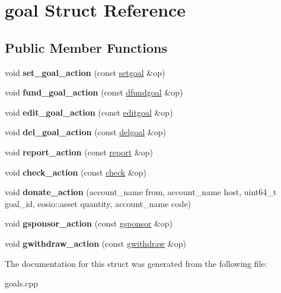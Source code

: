 \hypertarget{structgoal}{}\section{goal Struct Reference}
\label{structgoal}
\subsection*{Public Member Functions}
\begin{DoxyCompactItemize}
\item 
\mbox{\label{structgoal_a2b4d6d4cae626c821e7f9db68bed234c}} 
void {\bfseries set\+\_\+goal\+\_\+action} (const \mbox{\hyperlink{structeosio_1_1setgoal}{setgoal}} \&op)
\item 
\mbox{\label{structgoal_a6b94d23a3260c39ea4a8e4d7dec1eb48}} 
void {\bfseries fund\+\_\+goal\+\_\+action} (const \mbox{\hyperlink{structeosio_1_1dfundgoal}{dfundgoal}} \&op)
\item 
\mbox{\label{structgoal_af0ac04fcbd4715711ec0789d6bfe8628}} 
void {\bfseries edit\+\_\+goal\+\_\+action} (const \mbox{\hyperlink{structeosio_1_1editgoal}{editgoal}} \&op)
\item 
\mbox{\label{structgoal_ade5d47a55d283800441011273c8f647b}} 
void {\bfseries del\+\_\+goal\+\_\+action} (const \mbox{\hyperlink{structeosio_1_1delgoal}{delgoal}} \&op)
\item 
\mbox{\label{structgoal_a5bc41891e23181adb003685702da42e8}} 
void {\bfseries report\+\_\+action} (const \mbox{\hyperlink{structeosio_1_1report}{report}} \&op)
\item 
\mbox{\label{structgoal_afb5497fc622695286beefadfc01e9777}} 
void {\bfseries check\+\_\+action} (const \mbox{\hyperlink{structeosio_1_1check}{check}} \&op)
\item 
\mbox{\label{structgoal_af6ee698f78f7749a678cb060460b3677}} 
void {\bfseries donate\+\_\+action} (account\+\_\+name from, account\+\_\+name host, uint64\+\_\+t goal\+\_\+id, eosio\+::asset quantity, account\+\_\+name code)
\item 
\mbox{\label{structgoal_afd41eb5b85ef6c3c0805fef91ae9b6d0}} 
void {\bfseries gsponsor\+\_\+action} (const \mbox{\hyperlink{structeosio_1_1gsponsor}{gsponsor}} \&op)
\item 
\mbox{\label{structgoal_a4c177a29bb9b091b8f2c6cdc852fbb00}} 
void {\bfseries gwithdraw\+\_\+action} (const \mbox{\hyperlink{structeosio_1_1gwithdraw}{gwithdraw}} \&op)
\end{DoxyCompactItemize}


The documentation for this struct was generated from the following file\+:\begin{DoxyCompactItemize}
\item 
goals.\+cpp\end{DoxyCompactItemize}
